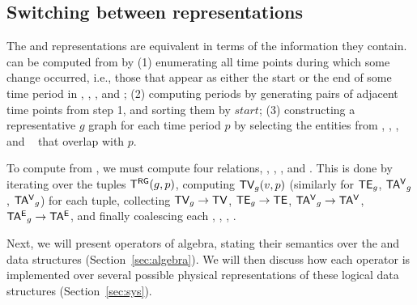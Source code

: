 

\subsection{Switching between representations}  
\label{sec:model:switch}

The \trg and \tve representations are equivalent in terms of the
information they contain.  \trg can be computed from \tve by (1)
enumerating all time points during which some change occurred, i.e.,
those that appear as either the start or the end of some time period
in \tv, \te, \tav, and \tae; (2) computing \rgs periods by generating
pairs of adjacent time points from step 1, and sorting them by
$start$; (3) constructing a representative $g$ graph for each time
period $p$ by selecting the entities from \tv, \te, \tav, and \tae~
that overlap with $p$.

To compute \ve from \rgs, we must compute four relations, \tv, \te,
\tav, and \tae.  This is done by iterating over the tuples $\mathsf{T^{RG}}
(g,p)$, computing $\textsf{TV}_g(v,p)$ (similarly for $\textsf{TE}_g$, $\mathsf{TA^{V}}_g$,
$\mathsf{TA^{V}}_g$) for each tuple, collecting $\textsf{TV}_g \rightarrow \textsf{TV}$, $\textsf{TE}_g
\rightarrow \textsf{TE}$, $\mathsf{TA^{V}}_g \rightarrow \mathsf{TA^{V}}$, $\mathsf{TA^{E}}_g \rightarrow
\mathsf{TA^{E}}$, and finally coalescing each \tv, \te, \tav, \tae.

Next, we will present operators of \tg algebra, stating their
semantics over the \rgs and \ve data structures
(Section~\ref{sec:algebra}).  We will then discuss how each operator
is implemented over several possible physical representations of these
logical data structures (Section~\ref{sec:sys}).

